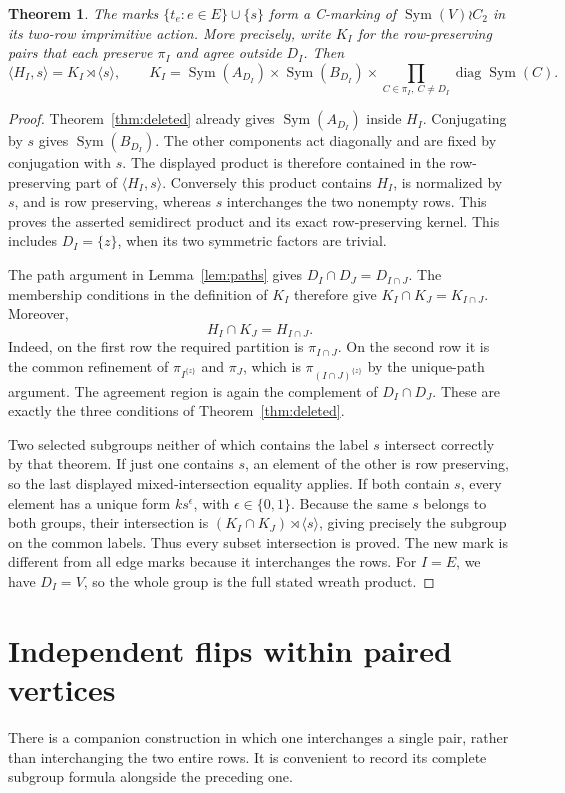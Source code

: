 \documentclass[a4paper,11pt]{article}
\newcommand{\Sym}{\operatorname{Sym}}
\newcommand{\gen}[1]{\langle #1\rangle}
\newtheorem{theorem}{Theorem}\newtheorem{lemma}[theorem]{Lemma}\newtheorem{corollary}[theorem]{Corollary}
\begin{document}
\begin{theorem}\label{thm:wreath}
The marks $\{t_e:e\in E\}\cup\{s\}$ form a C-marking of
$\Sym(V)\wr C_2$ in its two-row imprimitive action.
More precisely, write $K_I$ for the row-preserving pairs that each preserve
$\pi_I$ and agree outside $D_I$. Then
\[
 \gen{H_I,s}=K_I\rtimes\gen{s},\qquad
 K_I=\Sym(A_{D_I})\times\Sym(B_{D_I})
       \times\prod_{C\in\pi_I,\ C\ne D_I}\operatorname{diag}\Sym(C).
\]
\end{theorem}
\begin{proof}
Theorem~\ref{thm:deleted} already gives $\Sym(A_{D_I})$ inside $H_I$.
Conjugating by $s$ gives $\Sym(B_{D_I})$. The other components act diagonally
and are fixed by conjugation with $s$. The displayed product is therefore
contained in the row-preserving part of $\gen{H_I,s}$. Conversely this product
contains $H_I$, is normalized by $s$, and is row preserving, whereas $s$
interchanges the two nonempty rows. This proves the asserted semidirect
product and its exact row-preserving kernel. This includes $D_I=\{z\}$,
when its two symmetric factors are trivial.

The path argument in Lemma~\ref{lem:paths} gives
$D_I\cap D_J=D_{I\cap J}$. The membership conditions in the definition of
$K_I$ therefore give $K_I\cap K_J=K_{I\cap J}$. Moreover,
\[
 H_I\cap K_J=H_{I\cap J}.
\]
Indeed, on the first row the required partition is $\pi_{I\cap J}$.
On the second row it is the common refinement of $\pi_{I^{\{z\}}}$ and
$\pi_J$, which is $\pi_{(I\cap J)^{\{z\}}}$ by the unique-path argument.
The agreement region is again the complement of $D_I\cap D_J$.
These are exactly the three conditions of Theorem~\ref{thm:deleted}.

Two selected subgroups neither of which contains the label $s$ intersect
correctly by that theorem. If just one contains $s$, an element of the other
is row preserving, so the last displayed mixed-intersection equality applies.
If both contain $s$, every element has a unique form $ks^\epsilon$, with
$\epsilon\in\{0,1\}$. Because the same $s$ belongs to both groups, their
intersection is $(K_I\cap K_J)\rtimes\gen{s}$, giving precisely the subgroup
on the common labels. Thus every subset intersection is proved. The new mark
is different from all edge marks because it interchanges the rows. For $I=E$,
we have $D_I=V$, so the whole group is the full stated wreath product.
\end{proof}

\section{Independent flips within paired vertices}
There is a companion construction in which one interchanges a single pair,
rather than interchanging the two entire rows. It is convenient to record
its complete subgroup formula alongside the preceding one.
\end{document}
